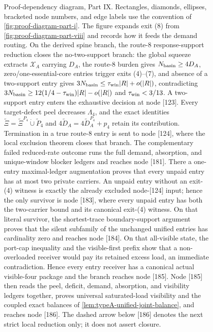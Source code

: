 \documentclass[11pt]{article}
\begin{document}
\begin{figure}[p]
\caption[Proof-dependency diagram, Part IX]{Proof-dependency diagram, Part IX.  Rectangles, diamonds, ellipses, bracketed node numbers, and edge labels use the convention of \cref{fig:proof-diagram-part-i}.  The figure expands exit (8) from \cref{fig:proof-diagram-part-viii} and records how it feeds the demand routing.  On the derived spine branch, the route-8 response-support reduction closes the no-two-support branch: the global squeeze extracts $\mathcal X_A$ carrying $D_A$, the route-8 burden gives \(N_{\rm basin}\ge4D_A\), zero/one-essential-core entries trigger exits (4)--(7), and absence of a two-support entry gives \(3N_{\rm basin}\le\tau_{\rm win}|R|+o(|R|)\), contradicting \(3N_{\rm basin}\ge12(1/4-\tau_{\rm win})|R|-o(|R|)\) and \(\tau_{\rm win}<3/13\).  A two-support entry enters the exhaustive decision at node [123].  Every target-defect peel decreases \(\Lambda_4\), and the exact identities \(\tilde\Xi=\tilde\Xi^{P_4}\mathbin{\dot\cup}\tilde P_4\) and \(4\tilde D_A=4\tilde D_A^{P_4}+p_4\) retain its contribution.  Termination in a true route-8 entry is sent to node [124], where the local exclusion theorem closes that branch.  The complementary failed reduced-rate outcome runs the full demand, absorption, and unique-window blocker ledgers and reaches node [181].  There a one-entry maximal-ledger augmentation proves that every unpaid entry has at most two private carriers.  An unpaid entry without an exit-\textup{(4)} witness is exactly the already excluded node-[124] input; hence the only survivor is node [183], where every unpaid entry has both the two-carrier bound and its canonical exit-\textup{(4)} witness.  On that literal survivor, the shortest-trace boundary-support argument proves that the silent subfamily of the unchanged unified entries has cardinality zero and reaches node [184].  On that all-visible state, the port-cap inequality and the visible-first prefix show that a non-overloaded receiver would pay its retained excess load, an immediate contradiction.  Hence every entry receiver has a canonical actual visible-four package and the branch reaches node [185].  Node [185] then reads the peel, deficit, demand, absorption, and visibility ledgers together, proves universal saturated-load visibility and the coupled exact balances of \cref{lem:typeA-unified-joint-balance}, and reaches node [186].  The dashed arrow below [186] denotes the next strict local reduction only; it does not assert closure.}
\label{fig:proof-diagram-part-ix}
\end{figure}

\clearpage
\end{document}

